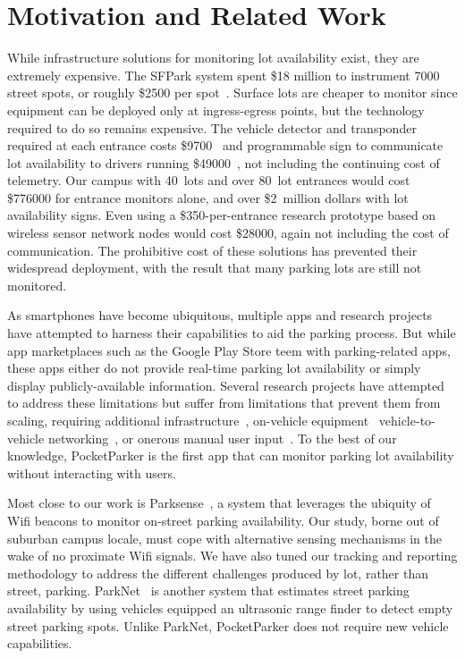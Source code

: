 \documentclass{sigchi}
\begin{document}

\section{Motivation and Related Work} While infrastructure solutions for
monitoring lot availability exist, they are extremely expensive. The SFPark
system spent \$18 million to instrument \num{7000} street spots, or roughly
\$\num{2500} per spot~\cite{sfpark}. Surface lots are cheaper to monitor
since equipment can be deployed only at ingress-egress points, but the
technology required to do so remains expensive. The vehicle detector and
transponder required at each entrance costs \$\num{9700}~\cite{car-detect}
and programmable sign to communicate lot availability to drivers running
\$\num{49000}~\cite{mstp-park}, not including the continuing cost of
telemetry. Our campus with 40~lots and over 80~lot entrances would cost
\$\num{776000} for entrance monitors alone, and over \$2~million dollars with
lot availability signs. Even using a \$\num{350}-per-entrance research
prototype based on wireless sensor network nodes would cost \$\num{28000},
again not including the cost of communication. The prohibitive cost of these
solutions has prevented their widespread deployment, with the result that
many parking lots are still not monitored.

As smartphones have become ubiquitous, multiple apps and research projects
have attempted to harness their capabilities to aid the parking process. But
while app marketplaces such as the Google Play Store teem with
parking-related apps, these apps either do not provide real-time parking lot
availability or simply display publicly-available information. Several
research projects have attempted to address these limitations but suffer from
limitations that prevent them from scaling, requiring additional
infrastructure~\cite{5062057}, on-vehicle equipment~\cite{Mathur:2010:PDS}
vehicle-to-vehicle networking~\cite{Delot:2009:CRP, Mathur:2010:PDS}, or
onerous manual user input~\cite{Chen:2012:COS}. To the best of our knowledge,
PocketParker is the first app that can monitor parking lot availability
without interacting with users.

Most close to our work is Parksense~\cite{Nawaz:2013:PSB}, a system that
leverages the ubiquity of Wifi beacons to monitor on-street parking
availability. Our study, borne out of suburban campus locale, must cope with
alternative sensing mechanisms in the wake of no proximate Wifi signals. We
have also tuned our tracking and reporting methodology to address the
different challenges produced by lot, rather than street, parking.
ParkNet~\cite{Mathur:2010:PDS} is another system that estimates street
parking availability by using vehicles equipped an ultrasonic range finder to
detect empty street parking spots. Unlike ParkNet, PocketParker does not
require new vehicle capabilities.
\end{document}
